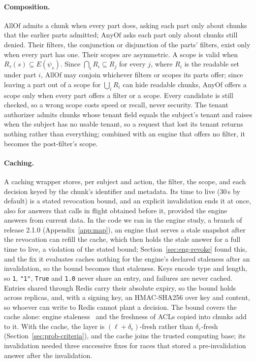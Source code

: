 \paragraph{Composition.}
$\mathrm{AllOf}$ admits a chunk when every part does, asking each part only about chunks that the
earlier parts admitted; $\mathrm{AnyOf}$ asks each part only about chunks still denied. Their
filters, the conjunction or disjunction of the parts' filters, exist only when every part has one.
Their scopes are asymmetric. A scope is valid when $R_\tau(s) \subseteq E(\psi_s)$. Since
$\bigcap_i R_i \subseteq R_j$ for every $j$, where $R_i$ is the readable set under part $i$, AllOf may
conjoin whichever filters or scopes its parts offer; since leaving a part out of a scope for
$\bigcup_i R_i$ can hide readable chunks, AnyOf offers a scope only when every part offers a filter or
a scope. Every candidate is still checked, so a wrong scope costs speed or recall, never security. The tenant authorizer admits chunks whose tenant
field equals the subject's tenant and raises when the subject has no usable tenant, so a request
that lost its tenant returns nothing rather than everything; combined with an engine that offers no
filter, it becomes the post-filter's scope.

\paragraph{Caching.}
A caching wrapper stores, per subject and action, the filter, the scope, and each decision keyed by
the chunk's identifier and metadata. Its time to live (30\,s by default) is a stated revocation
bound, and an explicit invalidation ends it at once, also for answers that calls in flight obtained
before it, provided the engine answers from current data. In the code we ran in the engine study, a branch of release 2.1.0 (Appendix~\ref{app:map}), an engine
that serves a stale snapshot after the revocation can refill the cache, which then holds the stale
answer for a full time to live, a violation of the stated bound; Section~\ref{sec:eng-revoke} found
this, and the fix it evaluates caches nothing for the engine's declared staleness after an
invalidation, so the bound becomes that staleness. Keys encode type and length, so \texttt{1}, \texttt{"1"}, \texttt{True} and \texttt{1.0}
never share an entry, and failures are never cached. Entries shared through Redis carry their
absolute expiry, so the bound holds across replicas, and, with a signing key, an HMAC-SHA256 over key
and content, so whoever can write to Redis cannot plant a decision. The bound covers the cache alone:
engine staleness~\cite{authzed2026consistency} and the freshness of ACLs copied into chunks add to
it. With the cache, the layer is $(\ell + \delta_e)$-fresh rather than $\delta_e$-fresh
(Section~\ref{sec:prob-criteria}), and the cache joins the trusted computing base; its invalidation
needed three successive fixes for races that stored a pre-invalidation answer after the invalidation.

